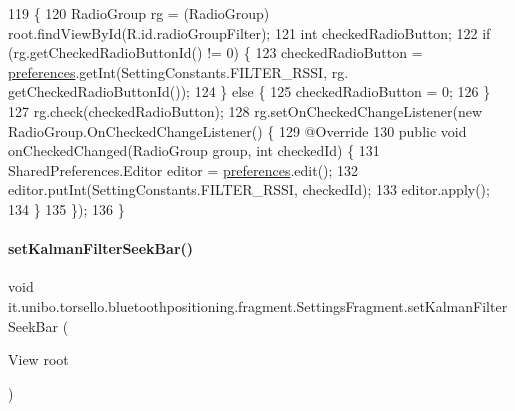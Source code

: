 \begin{DoxyCode}
119                                          \{
120         RadioGroup rg = (RadioGroup) root.findViewById(R.id.radioGroupFilter);
121         \textcolor{keywordtype}{int} checkedRadioButton;
122         \textcolor{keywordflow}{if} (rg.getCheckedRadioButtonId() != 0) \{
123             checkedRadioButton = \hyperlink{classit_1_1unibo_1_1torsello_1_1bluetoothpositioning_1_1fragment_1_1SettingsFragment_a52480c4d5d81ca59fe4a98ae3c623ea4_a52480c4d5d81ca59fe4a98ae3c623ea4}{preferences}.getInt(SettingConstants.FILTER\_RSSI, rg.
      getCheckedRadioButtonId());
124         \} \textcolor{keywordflow}{else} \{
125             checkedRadioButton = 0;
126         \}
127         rg.check(checkedRadioButton);
128         rg.setOnCheckedChangeListener(\textcolor{keyword}{new} RadioGroup.OnCheckedChangeListener() \{
129             @Override
130             \textcolor{keyword}{public} \textcolor{keywordtype}{void} onCheckedChanged(RadioGroup group, \textcolor{keywordtype}{int} checkedId) \{
131                 SharedPreferences.Editor editor = \hyperlink{classit_1_1unibo_1_1torsello_1_1bluetoothpositioning_1_1fragment_1_1SettingsFragment_a52480c4d5d81ca59fe4a98ae3c623ea4_a52480c4d5d81ca59fe4a98ae3c623ea4}{preferences}.edit();
132                 editor.putInt(SettingConstants.FILTER\_RSSI, checkedId);
133                 editor.apply();
134             \}
135         \});
136     \}
\end{DoxyCode}
\hypertarget{classit_1_1unibo_1_1torsello_1_1bluetoothpositioning_1_1fragment_1_1SettingsFragment_a84057f1633708ec85de5968ed9e7f032_a84057f1633708ec85de5968ed9e7f032}{}\label{classit_1_1unibo_1_1torsello_1_1bluetoothpositioning_1_1fragment_1_1SettingsFragment_a84057f1633708ec85de5968ed9e7f032_a84057f1633708ec85de5968ed9e7f032} 
\paragraph{\texorpdfstring{set\+Kalman\+Filter\+Seek\+Bar()}{setKalmanFilterSeekBar()}}
{\footnotesize\ttfamily void it.\+unibo.\+torsello.\+bluetoothpositioning.\+fragment.\+Settings\+Fragment.\+set\+Kalman\+Filter\+Seek\+Bar (\begin{DoxyParamCaption}\item[{View}]{root }\end{DoxyParamCaption})\hspace{0.3cm}{\ttfamily [private]}}


